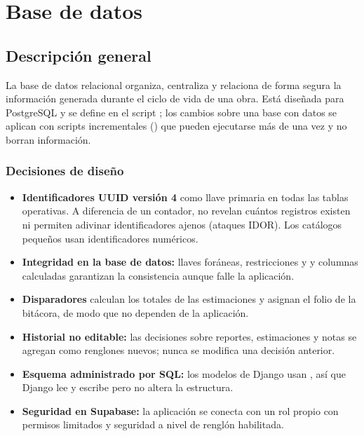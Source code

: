 \chapter{Base de datos}

\section{Descripción general}
La base de datos relacional organiza, centraliza y relaciona de forma segura la información generada durante el ciclo de vida de una obra. Está diseñada para PostgreSQL y se define en el script ; los cambios sobre una base con datos se aplican con scripts incrementales () que pueden ejecutarse más de una vez y no borran información.

\subsection*{Decisiones de diseño}
\begin{itemize}
  \item \textbf{Identificadores UUID versión 4} como llave primaria en todas las tablas operativas. A diferencia de un contador, no revelan cuántos registros existen ni permiten adivinar identificadores ajenos (ataques IDOR). Los catálogos pequeños usan identificadores numéricos.
  \item \textbf{Integridad en la base de datos:} llaves foráneas, restricciones  y  y columnas calculadas garantizan la consistencia aunque falle la aplicación.
  \item \textbf{Disparadores} calculan los totales de las estimaciones y asignan el folio de la bitácora, de modo que no dependen de la aplicación.
  \item \textbf{Historial no editable:} las decisiones sobre reportes, estimaciones y notas se agregan como renglones nuevos; nunca se modifica una decisión anterior.
  \item \textbf{Esquema administrado por SQL:} los modelos de Django usan , así que Django lee y escribe pero no altera la estructura.
  \item \textbf{Seguridad en Supabase:} la aplicación se conecta con un rol propio con permisos limitados y seguridad a nivel de renglón habilitada.
\end{itemize}

